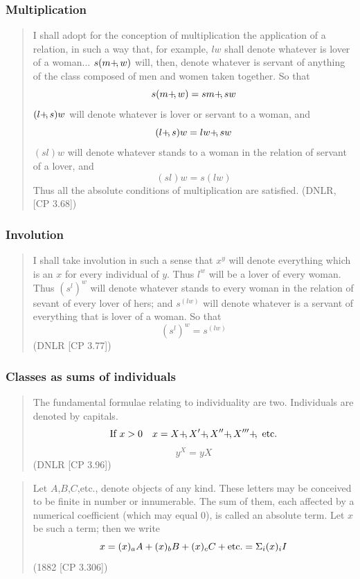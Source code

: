 \documentclass[compress,12pt]{beamer}
\newcommand*{\add}{+\mkern-4mu,}
\begin{document}
\begin{frame}
    \frametitle{Multiplication}
    \begin{quote}{\setlength{\abovedisplayskip}{0pt}
        \setlength{\belowdisplayskip}{0pt}
        I shall adopt for the conception of multiplication \textup{the application of a relation}, in such a way that, for example, $lw$ shall denote whatever is lover of a woman... $s(m\add w)$ will, then, denote whatever is servant of anything of the class composed of men and women taken together. So that
        $$s(m\add w)=sm\add sw$$
        $(l\add s)w$ will denote whatever is lover or servant to a woman, and
        $$(l\add s)w=lw\add sw$$
        $(sl)w$ will denote whatever stands to a woman in the relation of servant of a lover, and
        $$(sl)w=s(lw)$$
        Thus all the absolute conditions of multiplication are satisfied. (DNLR, [CP 3.68])}
    \end{quote}
\end{frame}

\begin{frame}
    \frametitle{Involution}
    \begin{quote}{\setlength{\abovedisplayskip}{0pt}
        \setlength{\belowdisplayskip}{0pt}
        I shall take involution in such a sense that $x^y$ will denote everything which is an $x$ for every individual of $y$. Thus $l^w$ will be a lover of every woman. Thus $(s^l)^w$ will denote whatever stands to every woman in the relation of sevant of every lover of hers; and $s^{(lw)}$ will denote whatever is a servant of everything that is lover of a woman. So that
        $$(s^l)^w=s^{(lw)}$$
        (DNLR [CP 3.77])}
    \end{quote}
\end{frame}

\begin{frame}
    \frametitle{Classes as sums of individuals}
    \begin{quote}{\setlength{\abovedisplayskip}{0pt}
        \setlength{\belowdisplayskip}{0pt}
        The fundamental formulae relating to individuality are two. Individuals are denoted by capitals.
        $$\textup{If } x>0\quad x=X\add X'\add X''\add X'''\add\ \textup{etc.}$$
        $$y^X=yX$$
        (DNLR [CP 3.96])}
    \end{quote}\quad
    \begin{quote}
        {\setlength{\abovedisplayskip}{0pt}
            \setlength{\belowdisplayskip}{0pt}
            Let $A$,$B$,$C$,etc., denote objects of any kind. These letters may be conceived to be finite in number or innumerable. The sum of them, each affected by a numerical coefficient (which may equal $0$), is called an \textup{absolute term}. Let $x$ be such a term; then we write
            $$x=(x)_aA+(x)_bB+(x)_cC+\textup{etc.}=\Sigma_i(x)_iI$$
            (1882 [CP 3.306])}
    \end{quote}
\end{frame}
\end{document}
